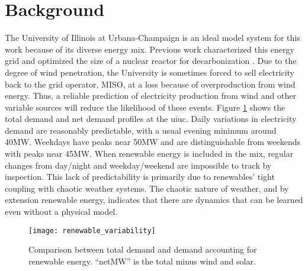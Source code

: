 \section{Background}


The University of Illinois at Urbana-Champaign is an ideal model system for
this work because of its diverse energy mix. Previous work
characterized this energy grid and optimized the size of a nuclear reactor
for decarbonization \cite{dotson_optimal_2020}. Due to the degree of wind
penetration, the University is sometimes
forced to sell electricity back to the grid operator, MISO, at a loss because
of overproduction
from wind energy. Thus, a reliable prediction of electricity production from
wind and other variable sources will reduce the likelihood of these events.
Figure \ref{figure:vre} shows the total demand and net demand profiles at the
\gls{uiuc}.
Daily variations in electricity demand are reasonably predictable, with a
usual evening minimum around 40MW. Weekdays have peaks near 50MW and are
distinguishable from weekends with peaks near 45MW. When renewable energy is
included in the mix, regular changes from day/night and weekday/weekend are
impossible to track by inspection. This lack of predictability is primarily due
to renewables' tight coupling with chaotic weather systems. The chaotic nature
of weather, and by extension renewable energy, indicates that there are
dynamics that can be learned even without a physical model.
\begin{figure}[h]
  \centering
  \texttt{[image: renewable\_variability]}
  \caption{Comparison between total demand and demand accounting for renewable
   energy. ``netMW'' is the total minus wind and solar.}
  \label{figure:vre}
\end{figure}


